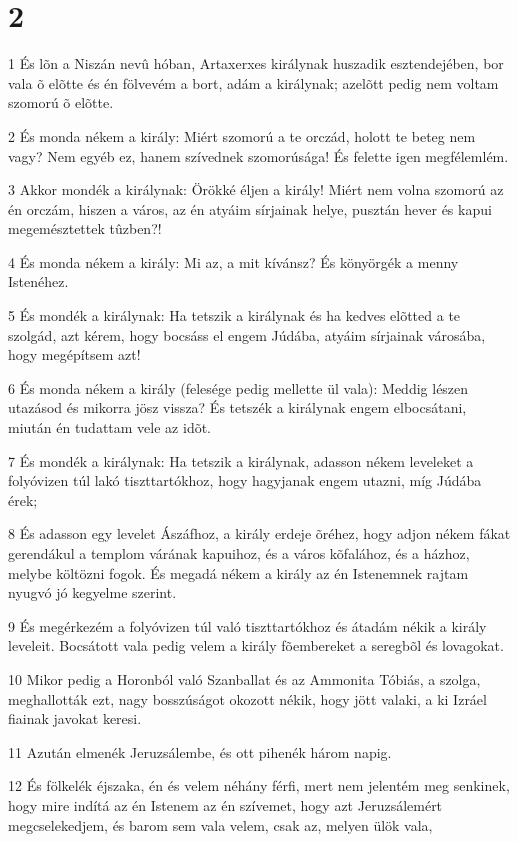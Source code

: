 \chapter{2}

\par 1 És lõn a Niszán nevû hóban, Artaxerxes királynak huszadik esztendejében, bor vala õ elõtte és én fölvevém a bort, adám a királynak; azelõtt pedig nem voltam szomorú õ elõtte.
\par 2 És monda nékem a király: Miért szomorú a te orczád, holott te beteg nem vagy? Nem egyéb ez, hanem szívednek szomorúsága! És felette igen megfélemlém.
\par 3 Akkor mondék a királynak: Örökké éljen a király! Miért nem volna szomorú az én orczám, hiszen a város, az én atyáim sírjainak helye, pusztán hever és kapui megemésztettek tûzben?!
\par 4 És monda nékem a király: Mi az, a mit kívánsz? És könyörgék a menny Istenéhez.
\par 5 És mondék a királynak: Ha tetszik a királynak és ha kedves elõtted a te szolgád, azt kérem, hogy bocsáss el engem Júdába, atyáim sírjainak városába, hogy megépítsem azt!
\par 6 És monda nékem a király (felesége pedig mellette ül vala): Meddig lészen utazásod és mikorra jösz vissza? És tetszék a királynak engem elbocsátani, miután én tudattam vele az idõt.
\par 7 És mondék a királynak: Ha tetszik a királynak, adasson nékem leveleket a folyóvizen túl lakó tiszttartókhoz, hogy hagyjanak engem utazni, míg Júdába érek;
\par 8 És adasson egy levelet Ászáfhoz, a király erdeje õréhez, hogy adjon nékem fákat gerendákul a templom várának kapuihoz, és a város kõfalához, és a házhoz, melybe költözni fogok. És megadá nékem a király az én Istenemnek rajtam nyugvó jó kegyelme szerint.
\par 9 És megérkezém a folyóvizen túl való tiszttartókhoz és átadám nékik a király leveleit. Bocsátott vala pedig velem a király fõembereket a seregbõl és lovagokat.
\par 10 Mikor pedig a Horonból való Szanballat és az Ammonita Tóbiás, a szolga, meghallották ezt, nagy bosszúságot okozott nékik, hogy jött valaki, a ki Izráel fiainak javokat keresi.
\par 11 Azután elmenék Jeruzsálembe, és ott pihenék három napig.
\par 12 És fölkelék éjszaka, én és velem néhány férfi, mert nem jelentém meg senkinek, hogy mire indítá az én Istenem az én szívemet, hogy azt Jeruzsálemért megcselekedjem, és barom sem vala velem, csak az, melyen ülök vala,
